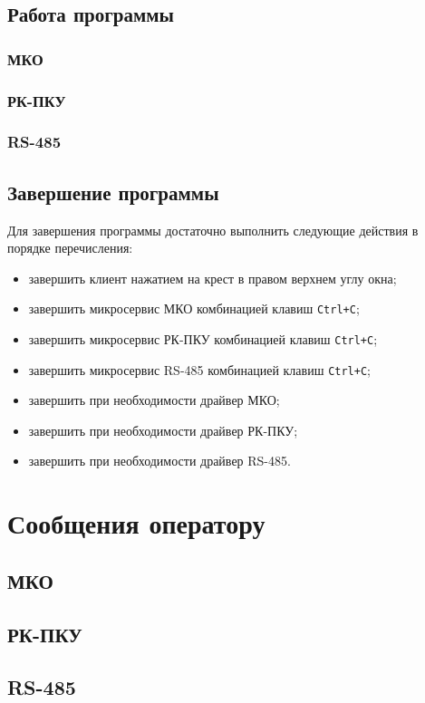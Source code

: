 \documentclass[a4paper, 14pt]{extreport}
\begin{document}
	\section{Работа программы}
	
	\subsection{МКО}
	
	
	
	\subsection{РК-ПКУ}
	
	
	
	\subsection{RS-485}
	
	
	
	\section{Завершение программы}
	
	Для завершения программы достаточно выполнить следующие действия в порядке перечисления:
	
	\begin{itemize}
		\item завершить клиент нажатием на крест в правом верхнем углу окна;
		\item завершить микросервис МКО комбинацией клавиш \texttt{Ctrl+C};
		\item завершить микросервис РК-ПКУ комбинацией клавиш \texttt{Ctrl+C};
		\item завершить микросервис RS-485 комбинацией клавиш \texttt{Ctrl+C};
		\item завершить при необходимости драйвер МКО;
		\item завершить при необходимости драйвер РК-ПКУ;
		\item завершить при необходимости драйвер RS-485.
	\end{itemize}

	\chapter{Сообщения оператору}
	\label{chapter_messages}
	
	\section{МКО}
	
	
	
	\section{РК-ПКУ}
	
	
	
	\section{RS-485}
	
	
\end{document}

